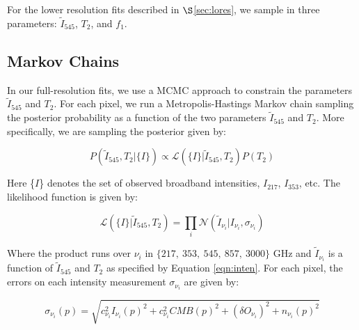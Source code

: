 \documentclass{emulateapj}
\begin{document}
For the lower resolution fits described in $\S$\ref{sec:lores}, we sample
in three parameters: $\tilde{I}_{545}$, $T_2$, and $f_1$.


\subsection{Markov Chains}
\label{sec:mcmc}

In our full-resolution fits, we use a MCMC approach to constrain the 
parameters $\tilde{I}_{545}$ and $T_2$. For each pixel, we run a 
Metropolis-Hastings Markov chain sampling the posterior probability as a 
function of the two parameters $\tilde{I}_{545}$ and $T_2$. More specifically, 
we are sampling the posterior given by:


\begin{equation}
\label{eqn:post}
P(\tilde{I}_{545}, T_2|\{I\}) \propto \mathcal{L}(\{I\}|\tilde{I}_{545}, T_2)P(T_2)
\end{equation}


Here \{$I$\} denotes the set of observed broadband intensities, $I_{217}$, 
$I_{353}$, etc. The likelihood function is given by:

\begin{equation} \label{equ:like}
\mathcal{L}(\{I\}|\tilde{I}_{545}, T_2) = \displaystyle\prod\limits_{i}\mathcal{N}(\tilde{I}_{\nu_{i}}|I_{\nu_{i}}, \sigma_{\nu_i})
\end{equation}


Where the product runs over $\nu_i$ in $\{217,\ 353,\ 545,\ 857,\ 3000\}$ GHz
and $\tilde{I}_{\nu_i}$ is a function of $\tilde{I}_{545}$ and $T_2$ as 
specified by Equation \ref{eqn:inten}. For each pixel, the errors on each 
intensity measurement $\sigma_{\nu_i}$ are given by:

\begin{equation}
\sigma_{\nu_i}(p) = \sqrt{c^2_{\nu_i}I_{\nu_i}(p)^2 + c^2_{\nu_i}CMB(p)^2 + (\delta O_{\nu_i})^2 + n_{\nu_i}(p)^2}
\end{equation}
\end{document}
